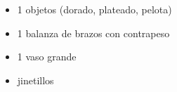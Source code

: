 \documentclass[../main]{subfiles}
\begin{document}
\begin{itemize}
  \item 1 objetos (dorado, plateado, pelota)
  \item 1 balanza de brazos con contrapeso
  \item 1 vaso grande
  \item jinetillos
\end{itemize}
\end{document}
